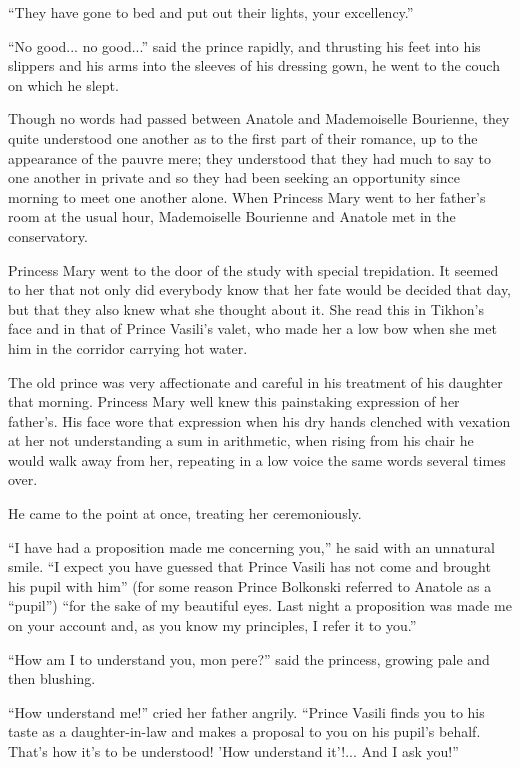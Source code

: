 ``They have gone to bed and put out their lights, your
excellency.''

``No good... no good...'' said the prince rapidly, and thrusting
his feet into his slippers and his arms into the sleeves of his
dressing gown, he went to the couch on which he slept.

Though no words had passed between Anatole and Mademoiselle
Bourienne, they quite understood one another as to the first part
of their romance, up to the appearance of the pauvre mere; they
understood that they had much to say to one another in private
and so they had been seeking an opportunity since morning to meet
one another alone. When Princess Mary went to her father's room
at the usual hour, Mademoiselle Bourienne and Anatole met in the
conservatory.

Princess Mary went to the door of the study with special
trepidation. It seemed to her that not only did everybody know
that her fate would be decided that day, but that they also knew
what she thought about it. She read this in Tikhon's face and in
that of Prince Vasili's valet, who made her a low bow when she
met him in the corridor carrying hot water.

The old prince was very affectionate and careful in his treatment
of his daughter that morning. Princess Mary well knew this
painstaking expression of her father's. His face wore that
expression when his dry hands clenched with vexation at her not
understanding a sum in arithmetic, when rising from his chair he
would walk away from her, repeating in a low voice the same words
several times over.

He came to the point at once, treating her ceremoniously.

``I have had a proposition made me concerning you,'' he said with
an unnatural smile. ``I expect you have guessed that Prince
Vasili has not come and brought his pupil with him'' (for some
reason Prince Bolkonski referred to Anatole as a ``pupil'') ``for
the sake of my beautiful eyes.  Last night a proposition was made
me on your account and, as you know my principles, I refer it to
you.''

``How am I to understand you, mon pere?'' said the princess,
growing pale and then blushing.

``How understand me!'' cried her father angrily. ``Prince Vasili
finds you to his taste as a daughter-in-law and makes a proposal
to you on his pupil's behalf. That's how it's to be understood!
'How understand it'!... And I ask you!''

